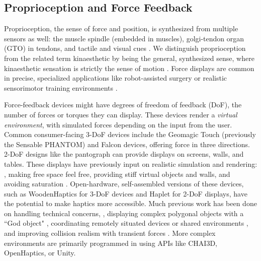 \subsection{Proprioception and Force Feedback}
Proprioception, the sense of force and position, is synthesized from multiple sensors as well: the muscle spindle (embedded in muscles), golgi-tendon organ (GTO) in tendons, and tactile and visual cues \cite{Kandel2000}.
We distinguish proprioception from the related term kinaesthetic by being the general, synthesized sense, where kinaesthetic sensation is strictly the sense of motion .
Force displays are common in precise, specialized applications like robot-assisted surgery \cite{Okamura2009} or realistic sensorimotor training environments \cite{VanDerMeijden2009}.

Force-feedback devices might have degrees of freedom of feedback (DoF), the number of forces or torques they can display.
These devices render a \emph{virtual environment}, with simulated forces depending on the input from the user.
Common consumer-facing 3-DoF devices include the Geomagic Touch (previously the Sensable PHANTOM) and Falcon devices, offering force in three directions.
2-DoF designs like the pantograph \cite{Ramstein1994,Campion2005} can provide displays on screens, walls, and tables.
These displays have previously input on realistic simulation and rendering: \eg, making free space feel free, providing stiff virtual objects and walls, and avoiding saturation  \cite{massie1994phantom}.
Open-hardware, self-assembled versions of these devices, such as WoodenHaptics \cite{Forsslund2015} for 3-DoF devices and Haplet \cite{Gallacher2016} for 2-DoF displays, have the potential to make haptics more accessible.
Much previous work has been done on handling technical concerns, \eg, displaying complex polygonal objects with a ``God object" \cite{Zilles1995}, coordinating remotely situated devices or shared environments \cite{Buttolo1997}, and improving collision realism with transient forces \cite{Kuchenbecker2006}.
More complex environments are primarily programmed in using APIs like CHAI3D, OpenHaptics, or Unity.

